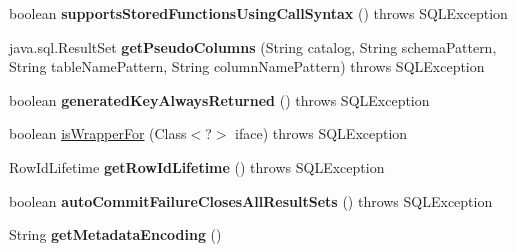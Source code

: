 \begin{DoxyCompactItemize}
\item 
\mbox{\label{classcom_1_1mysql_1_1cj_1_1jdbc_1_1_database_meta_data_a56930c0a067d1194bb7170cf2f02253c}} 
boolean {\bfseries supports\+Stored\+Functions\+Using\+Call\+Syntax} ()  throws S\+Q\+L\+Exception 
\item 
\mbox{\label{classcom_1_1mysql_1_1cj_1_1jdbc_1_1_database_meta_data_a73c07590f0e4126b32717521f8e2c4f6}} 
java.\+sql.\+Result\+Set {\bfseries get\+Pseudo\+Columns} (String catalog, String schema\+Pattern, String table\+Name\+Pattern, String column\+Name\+Pattern)  throws S\+Q\+L\+Exception 
\item 
\mbox{\label{classcom_1_1mysql_1_1cj_1_1jdbc_1_1_database_meta_data_a1ea77ece9e49b06c4ce2ea55d0fef7de}} 
boolean {\bfseries generated\+Key\+Always\+Returned} ()  throws S\+Q\+L\+Exception 
\item 
boolean \mbox{\hyperlink{classcom_1_1mysql_1_1cj_1_1jdbc_1_1_database_meta_data_a8e0ea42ccbf774371b197a8bd88b42d3}{is\+Wrapper\+For}} (Class$<$?$>$ iface)  throws S\+Q\+L\+Exception 
\item 
\mbox{\label{classcom_1_1mysql_1_1cj_1_1jdbc_1_1_database_meta_data_ad52a8d0aa3c87e60af97a39d4819509a}} 
Row\+Id\+Lifetime {\bfseries get\+Row\+Id\+Lifetime} ()  throws S\+Q\+L\+Exception 
\item 
\mbox{\label{classcom_1_1mysql_1_1cj_1_1jdbc_1_1_database_meta_data_acadecc234640e9cc54b2730537aa4482}} 
boolean {\bfseries auto\+Commit\+Failure\+Closes\+All\+Result\+Sets} ()  throws S\+Q\+L\+Exception 
\item 
\mbox{\label{classcom_1_1mysql_1_1cj_1_1jdbc_1_1_database_meta_data_abaf2a186f349f206faf7bdea13e8ed10}} 
String {\bfseries get\+Metadata\+Encoding} ()
\item 
\mbox{\label{classcom_1_1mysql_1_1cj_1_1jdbc_1_1_database_meta_data_a86a2b8462fa1740812ae01ab9b0a5abe}} 

\end{DoxyCompactItemize}
